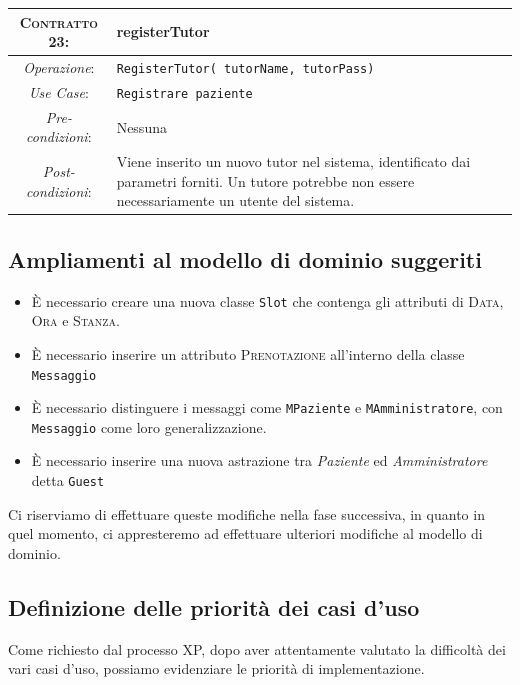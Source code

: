 \begin{tabularx}{\columnwidth}{cX}
\toprule
\textsc{Contratto 23}:&	\textbf{registerTutor}\\
\midrule
\textit{Operazione}: & 	\texttt{RegisterTutor( tutorName, tutorPass)}\\
\textit{Use Case}: &	\texttt{Registrare paziente}\\
\textit{Pre-condizioni}: & Nessuna\\
\textit{Post-condizioni}: & Viene inserito un nuovo tutor nel sistema, identificato
 dai parametri forniti. Un tutore potrebbe non essere necessariamente un utente 
 del sistema.\\
\bottomrule
\end{tabularx}
\medskip



\subsection{Ampliamenti al modello di dominio suggeriti}
\label{subsubsec:aamddomsugg_admin}
\begin{itemize}
\item È necessario creare una nuova classe \texttt{Slot} che 
contenga gli attributi di \textsc{Data}, \textsc{Ora} e
\textsc{Stanza}.
\item È necessario inserire un attributo \textsc{Prenotazione} all'interno
della classe \texttt{Messaggio}
\item È necessario distinguere i messaggi come \texttt{MPaziente} e \texttt{MAmministratore},
	con \texttt{Messaggio} come loro generalizzazione.
\item È necessario inserire una nuova astrazione tra \textit{Paziente} ed \textit{Amministratore}
detta \texttt{Guest}
\end{itemize}

Ci riserviamo di effettuare queste modifiche nella fase successiva, in quanto
in quel momento, ci appresteremo ad effettuare ulteriori modifiche al modello
di dominio.

\subsection{Definizione delle priorità dei casi d'uso}
Come richiesto dal processo XP, dopo aver attentamente valutato la difficoltà
dei vari casi d'uso, possiamo evidenziare le priorità di implementazione.

